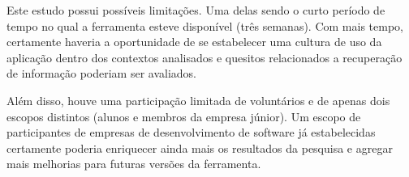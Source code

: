 Este estudo possui possíveis limitações. Uma delas sendo o curto período de tempo no qual a ferramenta esteve disponível (três semanas). Com mais tempo, certamente haveria a oportunidade de se estabelecer uma cultura de uso da aplicação dentro dos contextos analisados e quesitos relacionados a recuperação de informação poderiam ser avaliados.

Além disso, houve uma participação limitada de voluntários e de apenas dois escopos distintos (alunos e membros da empresa júnior). Um escopo de participantes de empresas de desenvolvimento de software já estabelecidas certamente poderia enriquecer ainda mais os resultados da pesquisa e agregar mais melhorias para futuras versões da ferramenta.
